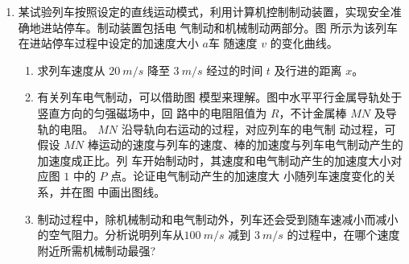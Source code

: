 \begin{enumerate}
\begin{enumerate}
\end{enumerate}
\begin{figure}[h!]
\flushright
\begin{subfigure}{0.3\linewidth}
\centering
 
\caption{}\label{2020:北京19:a}
\end{subfigure}
\begin{subfigure}{0.3\linewidth}
\centering
 
\caption{}\label{2020:北京19:b}
\end{subfigure}
\end{figure}





\newpage
\item 
某试验列车按照设定的直线运动模式，利用计算机控制制动装置，实现安全准确地进站停车。制动装置包括电
气制动和机械制动两部分。图  所示为该列车在进站停车过程中设定的加速度大小 $ a $车 随速度 $ v $ 的变化曲线。
\begin{enumerate}
\item
求列车速度从 $ 20 \ m/s $ 降至 $ 3 \ m/s $ 经过的时间 $ t $ 及行进的距离 $ x $。
\item 
有关列车电气制动，可以借助图  模型来理解。图中水平平行金属导轨处于竖直方向的匀强磁场中，回
路中的电阻阻值为 $ R $，不计金属棒 $ MN $ 及导轨的电阻。 $ MN $ 沿导轨向右运动的过程，对应列车的电气制
动过程，可假设 $ MN $ 棒运动的速度与列车的速度、棒的加速度与列车电气制动产生的加速度成正比。列
车开始制动时，其速度和电气制动产生的加速度大小对应图 $ 1 $ 中的 $ P $ 点。论证电气制动产生的加速度大
小随列车速度变化的关系，并在图 中画出图线。

\item 
制动过程中，除机械制动和电气制动外，列车还会受到随车速减小而减小的空气阻力。分析说明列车从$ 100 \ m/s $ 减到 $ 3 \ m/s $ 的过程中，在哪个速度附近所需机械制动最强?



\end{enumerate}
\end{enumerate}
